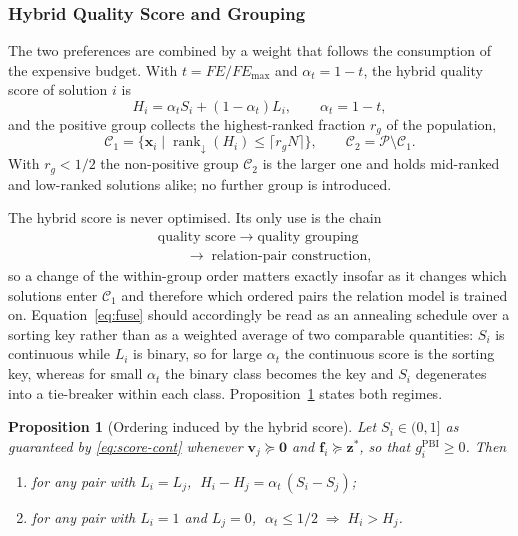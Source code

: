 \documentclass[final,5p,times,twocolumn]{elsarticle}
\newtheorem{proposition}{Proposition}
\newcommand{\vf}{\mathbf{f}}
\newcommand{\vx}{\mathbf{x}}
\newcommand{\vv}{\mathbf{v}}
\newcommand{\vz}{\mathbf{z}}
\begin{document}
\subsubsection{Hybrid Quality Score and Grouping}
\label{sec:method:hpc:hybrid}

The two preferences are combined by a weight that follows the consumption of the
expensive budget. With $t=FE/FE_{\max}$ and $\alpha_t=1-t$, the hybrid quality
score of solution $i$ is
\begin{equation}
H_i=\alpha_t S_i+(1-\alpha_t)L_i ,
\qquad
\alpha_t=1-t ,
\label{eq:fuse}
\end{equation}
and the positive group collects the highest-ranked fraction $r_g$ of the
population,
\begin{equation}
\mathcal{C}_1=\bigl\{\vx_i\;\big|\;
\operatorname{rank}_{\downarrow}(H_i)\leq\lceil r_gN\rceil\bigr\},
\qquad
\mathcal{C}_2=\mathcal{P}\setminus\mathcal{C}_1 .
\label{eq:group}
\end{equation}
With $r_g<1/2$ the non-positive group $\mathcal{C}_2$ is the larger one and
holds mid-ranked and low-ranked solutions alike; no further group is
introduced.

The hybrid score is never optimised. Its only use is the chain
\begin{equation*}
\begin{aligned}
&\text{quality score}\;\rightarrow\;\text{quality grouping}\\
&\qquad\rightarrow\;\text{relation-pair construction},
\end{aligned}
\end{equation*}
so a change of the within-group order matters exactly insofar as it changes
which solutions enter $\mathcal{C}_1$ and therefore which ordered pairs the
relation model is trained on. Equation~\eqref{eq:fuse} should accordingly be
read as an annealing schedule over a sorting key rather than as a weighted
average of two comparable quantities: $S_i$ is continuous while $L_i$ is
binary, so for large $\alpha_t$ the continuous score is the sorting key,
whereas for small $\alpha_t$ the binary class becomes the key and $S_i$
degenerates into a tie-breaker within each class. Proposition~\ref{prop:order}
states both regimes.

\begin{proposition}[Ordering induced by the hybrid score]
\label{prop:order}
Let $S_i\in(0,1]$ as guaranteed by \eqref{eq:score-cont} whenever
$\vv_j\succeq\bm{0}$ and $\vf_i\succeq\vz^{*}$, so that
$g_i^{\mathrm{PBI}}\geq0$. Then
\begin{enumerate}[label=(\roman*),leftmargin=*,itemsep=1pt]
\item for any pair with $L_i=L_j$,
      $\;H_i-H_j=\alpha_t\,(S_i-S_j)$;
\item for any pair with $L_i=1$ and $L_j=0$,
      $\;\alpha_t\leq1/2\;\Rightarrow\;H_i>H_j$.
\end{enumerate}
\end{proposition}
\end{document}
